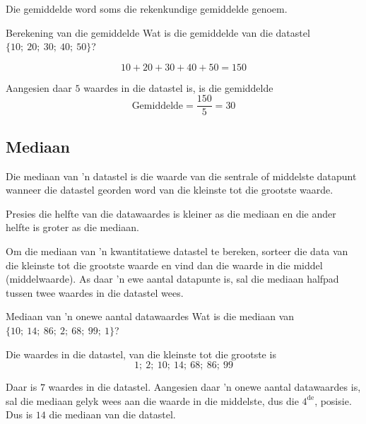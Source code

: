 Die gemiddelde word soms die rekenkundige gemiddelde genoem.
\par
{}

\begin{wex}{Berekening van die gemiddelde}
{Wat is die gemiddelde van die datastel $\{10;\ 20;\ 30;\ 40;\ 50\}$?}
{
  \begin{equation*}
    10 + 20 + 30 + 40 + 50 = 150
  \end{equation*}


  Aangesien daar $5$ waardes in die datastel is, is die gemiddelde
  \begin{equation*}
    \mbox{Gemiddelde} = \frac{150}{5} = 30
  \end{equation*}
}
\end{wex}

\subsection{Mediaan}
{Die mediaan van 'n datastel is die waarde van die sentrale of middelste datapunt wanneer die datastel georden word van die kleinste tot die grootste waarde.}

Presies die helfte van die datawaardes is kleiner as die mediaan en die ander helfte is groter as die mediaan.\par

Om die mediaan van 'n kwantitatiewe datastel te bereken, sorteer die data van die kleinste tot die grootste waarde en vind dan die waarde in die middel (middelwaarde). As daar 'n ewe aantal datapunte is, sal die mediaan halfpad tussen twee waardes in die datastel wees.

\begin{wex}{Mediaan van 'n onewe aantal datawaardes}
{Wat is die mediaan van $\{10;\ 14;\ 86;\ 2;\ 68;\ 99;\ 1\}$?}
{

  Die waardes in die datastel, van die kleinste tot die grootste is
  \begin{equation*}
    1;\ 2;\ 10;\ 14;\ 68;\ 86;\ 99
  \end{equation*}


  Daar is $7$ waardes in die datastel. Aangesien daar 'n onewe aantal datawaardes is, sal die mediaan gelyk wees aan die waarde in die middelste, dus die $4^{\mathrm{de}}$, posisie. Dus is $14$ die mediaan van die datastel.
}
\end{wex}

